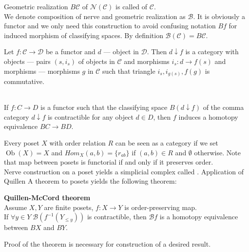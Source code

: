 \begin{definition}
  Geometric realization $B\mathcal{C}$ of $\mathcal{N}(\mathcal{C})$ is called  of $\mathcal{C}$.\\

  We denote composition of nerve and geometric realization as $\mathcal{B}$. It is obviously a functor and we only need this construction to avoid confusing notation $Bf$ for induced morphism of classifying spaces. By definition $\mathcal{B}(\mathcal{C}) = B\mathcal{C}$.
\end{definition}

\begin{definition}
  Let $f: \mathcal{C} \to \mathcal{D}$ be a functor and $d$ --- object in $\mathcal{D}$. Then  $d \downarrow f$ is a category with objects --- pairs $(s,i_s)$ of objects in $\mathcal{C}$ and morphisms $i_s : d \to f(s)$ and morphisms --- morphisms $g$ in $\mathcal{C}$ such that triangle $i_s, i_{g(s)}, f(g)$ is commutative.
\end{definition}

\begin{theorem} {\cite[Theorem A]{Quillen72}}\\
  If $f: C \to D$ is a functor such that the classifying space $B(d \downarrow f)$ of the comma category $d \downarrow f$ is contractible for any object $d \in D$, then $f$ induces a homotopy equivalence $BC \to BD$.
\end{theorem}

Every poset $X$ with order relation $R$ can be seen as a category if we set $\operatorname{Ob}(X) = X$ and $Hom_X(a,b) = \{r_{ab}\}$ if $(a,b) \in R$ and $\emptyset$ otherwise. Note that map between posets is functorial if and only if it preserves order.\\
Nerve construction on a poset yields a simplicial complex called . Application of Quillen A theorem to posets yields the following theorem:

\begin{theorem} \textbf{Quillen-McCord theorem}\\
  Assume $X, Y$ are finite posets, $f : X \to Y$ is order-preserving map.\\
  If $\forall y \in Y\;\mathcal{B}(f^{-1}(Y_{\leqslant y}))$ is contractible, then $\mathcal{B}f$ is a homotopy equivalence between $BX$ and $BY$.\\
\end{theorem}

Proof of the theorem is necessary for construction of a desired result.\\
